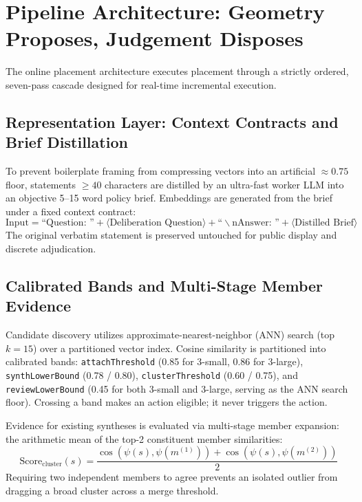 \documentclass{article}
\begin{document}
\section{Pipeline Architecture: Geometry Proposes, Judgement Disposes}

The online placement architecture executes placement through a strictly ordered, seven-pass cascade designed for real-time incremental execution.

\subsection{Representation Layer: Context Contracts and Brief Distillation}

To prevent boilerplate framing from compressing vectors into an artificial $\approx 0.75$ floor, statements $\geq 40$ characters are distilled by an ultra-fast worker LLM into an objective 5--15 word policy brief. Embeddings are generated from the brief under a fixed context contract:
\begin{equation}
\text{Input} = \text{``Question: ''} + \langle \text{Deliberation Question} \rangle + \text{``}\backslash\text{nAnswer: ''} + \langle \text{Distilled Brief} \rangle
\end{equation}
The original verbatim statement is preserved untouched for public display and discrete adjudication.

\subsection{Calibrated Bands and Multi-Stage Member Evidence}

Candidate discovery utilizes approximate-nearest-neighbor (ANN) search (top $k=15$) over a partitioned vector index. Cosine similarity is partitioned into calibrated bands: \texttt{attachThreshold} (0.85 for 3-small, 0.86 for 3-large), \texttt{synthLowerBound} (0.78 / 0.80), \texttt{clusterThreshold} (0.60 / 0.75), and \texttt{reviewLowerBound} (0.45 for both 3-small and 3-large, serving as the ANN search floor). Crossing a band makes an action eligible; it never triggers the action.

Evidence for existing syntheses is evaluated via multi-stage member expansion: the arithmetic mean of the top-2 constituent member similarities:
\begin{equation}
\mathrm{Score}_{\mathrm{cluster}}(s) = \frac{\cos(\psi(s), \psi(m^{(1)})) + \cos(\psi(s), \psi(m^{(2)}))}{2}
\end{equation}
Requiring two independent members to agree prevents an isolated outlier from dragging a broad cluster across a merge threshold.
\end{document}
